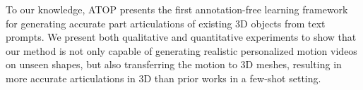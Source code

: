 To our knowledge, ATOP presents the first annotation-free learning framework for generating accurate part articulations of existing 3D objects from text prompts. We present both qualitative and quantitative experiments to show that our method is not only capable of generating realistic personalized motion videos on unseen shapes, but also transferring the motion to 3D meshes, resulting in more accurate articulations in 3D than prior works in a few-shot setting.


